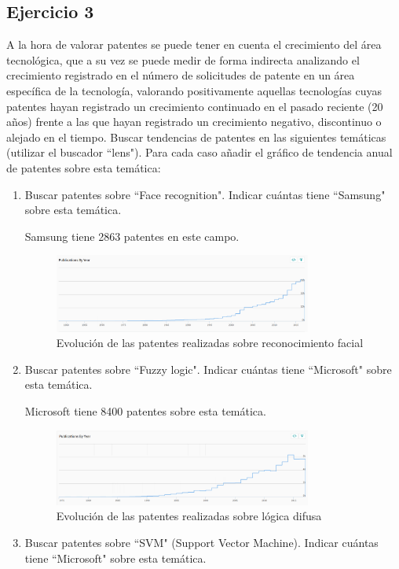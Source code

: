 \documentclass[11pt,leqno]{article}
\begin{document}
\subsection{Ejercicio 3}
A la hora de valorar patentes se puede tener en cuenta el crecimiento del área 
tecnológica, que a su vez se puede medir de forma indirecta analizando el 
crecimiento registrado en el número de solicitudes de patente en un área 
específica de la tecnología, valorando
positivamente aquellas tecnologías cuyas patentes hayan registrado un 
crecimiento continuado en el pasado reciente (20 años) frente a las que hayan 
registrado un crecimiento negativo, discontinuo o alejado en el tiempo.
Buscar tendencias de patentes en las siguientes temáticas (utilizar el buscador ``lens").
Para cada caso añadir el gráfico de tendencia anual de patentes sobre esta temática:
\begin{enumerate}
\item Buscar patentes sobre ``Face recognition". Indicar cuántas 
tiene ``Samsung" sobre esta temática.

Samsung tiene 2863 patentes en este campo.

\begin{figure}[h!]
\centering
\includegraphics[width=0.8\textwidth]{Face}
\caption{Evolución de las patentes realizadas sobre reconocimiento facial}
\end{figure}

\item Buscar patentes sobre ``Fuzzy logic". 
Indicar cuántas tiene ``Microsoft" sobre esta temática.

Microsoft tiene 8400 patentes sobre esta temática.

\begin{figure}[h!]
\centering
\includegraphics[width=0.8\textwidth]{Fuzzy}
\caption{Evolución de las patentes realizadas sobre lógica difusa}
\end{figure}
\item Buscar patentes sobre ``SVM" (Support Vector Machine). 
Indicar cuántas tiene ``Microsoft" sobre esta temática.


\end{enumerate}
\end{document}
